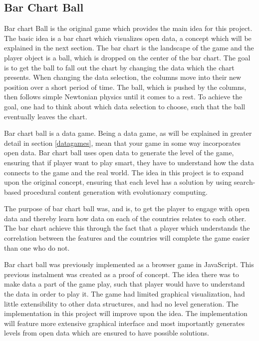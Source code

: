 \documentclass[a4paper,11pt]{article}
\begin{document}
\subsection{Bar Chart Ball}
\label{back:barchartball}
Bar chart Ball is the original game which provides the main idea for this project\cite{barchartball}. The basic idea is a bar chart which visualizes open data, a concept which will be explained in the next section. The bar chart is the landscape of the game and the player object is a ball, which is dropped on the center of the bar chart. The goal is to get the ball to fall out the chart by changing the data which the chart presents. When changing the data selection, the columns move into their new position over a short period of time. The ball, which is pushed by the columns, then follows simple Newtonian physics until it comes to a rest. To achieve the goal, one had to think about which data selection to choose, such that the ball eventually leaves the chart. 

Bar chart ball is a data game. Being a data game, as will be explained in greater detail in section \ref{datagames}, mean that your game in some way incorporates open data. Bar chart ball uses open data to generate the level of the game, ensuring that if player want to play smart, they have to understand how the data connects to the game and the real world. The idea in this project is to expand upon the original concept, ensuring that each level has a solution by using search-based procedural content generation with evolutionary computing.

The purpose of bar chart ball was, and is, to get the player to engage with open data and thereby learn how data on each of the countries relates to each other. The bar chart achieve this through the fact that a player which understands the correlation between the features and the countries will complete the game easier than one who do not.

Bar chart ball was previously implemented as a browser game in JavaScript. This previous instalment was created as a proof of concept. The idea there was to make data a part of the game play, such that player would have to understand the data in order to play it. The game had limited graphical visualization, had little extensibility to other data structures, and had no level generation. 
The implementation in this project will improve upon the idea. The implementation will feature more extensive graphical interface and most importantly generates levels from open data which are ensured to have possible solutions. 
\end{document}

